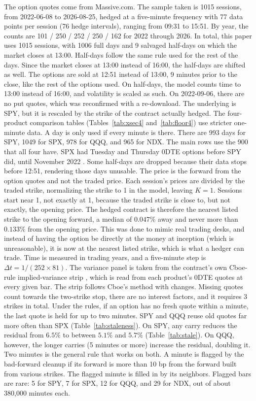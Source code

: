 \documentclass[11pt]{article}
\begin{document}
The option quotes come from Massive.com. The sample taken is 1015 sessions, from 2022-06-08 to 2026-08-25, hedged at a five-minute frequency with 77 data points per session (76 hedge intervals), ranging from 09:31 to 15:51.
By year, the counts are 101 / 250 / 252 / 250 / 162 for 2022 through 2026.
In total, this paper uses 1015 sessions, with 1006 full days and 9 salvaged half-days on which the market closes at 13:00. Half-days follow the same rule used for the rest of the days. Since the market closes at 13:00 instead of 16:00, the half-days are shifted as well. The options are sold at 12:51 instead of 13:00, 9 minutes prior to the close, like the rest of the options used. On half-days, the model counts time to 13:00 instead of 16:00, and volatility is scaled as such. On 2022-09-06, there are no put quotes, which was reconfirmed with a re-download.
The underlying is SPY, but it is rescaled by the strike of the contract actually hedged.
The four-product comparison tables (Tables~\ref{tab:xsec4} and~\ref{tab:floor4}) use stricter one-minute data. A day is only used if every minute is there. There are 993 days for SPY, 1049 for SPX, 978 for QQQ, and 965 for NDX. The main rows use the 900 that all four have. SPX had Tuesday and Thursday 0DTE options before SPY did, until November 2022 \cite{cboespx2022, cboespy2022}. Some half-days are dropped because their data stops before 12:51, rendering those days unusable. The price is the forward from the option quotes and not the traded price.
Each session's prices are divided by the traded strike, normalizing the strike to 1 in the model, leaving $K = 1$. Sessions start near 1, not exactly at 1, because the traded strike is close to, but not exactly, the opening price.
The hedged contract is therefore the nearest listed strike to the opening forward, a median of $0.047\%$ away and never more than $0.133\%$ from the opening price.
This was done to mimic real trading desks, and instead of having the option be directly at the money at inception (which is unreasonable), it is now at the nearest listed strike, which is what a hedger can trade.
Time is measured in trading years, and a five-minute step is $\Delta t = 1/(252 \times 81)$.
The variance panel is taken from the contract's own Cboe-rule implied-variance strip \cite{cboemath}, which is read from each product's 0DTE quotes at every given bar. The strip follows Cboe's method with changes. Missing quotes count towards the two-strike stop, there are no interest factors, and it requires 3 strikes in total.
Under the rules, if an option has no fresh quote within a minute, the last quote is held for up to two minutes. SPY and QQQ reuse old quotes far more often than SPX (Table~\ref{tab:staleness}). On SPY, any carry reduces the residual from $6.5\%$ to between $5.1\%$ and $5.7\%$ (Table~\ref{tab:stale}). On QQQ, however, the longer carries (5 minutes or more) increase the residual, doubling it. Two minutes is the general rule that works on both. A minute is flagged by the bad-forward cleanup if its forward is more than 10 bp from the forward built from various strikes. The flagged minute is filled in by its neighbors. Flagged bars are rare: 5 for SPY, 7 for SPX, 12 for QQQ, and 29 for NDX, out of about 380{,}000 minutes each.
\end{document}
